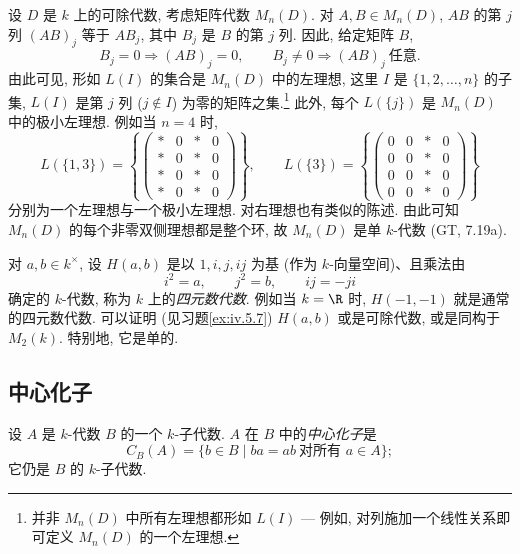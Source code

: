 \begin{example}\label{ex:iv.1.11}
设 $D$ 是 $k$ 上的可除代数, 考虑矩阵代数 $M_n(D)$. 对 $A,B\in M_n(D)$, $AB$ 的第 $j$ 列 $(AB)_j$ 等于 $AB_j$, 其中 $B_j$ 是 $B$ 的第 $j$ 列. 因此, 给定矩阵 $B$,
\[
B_{j}=0\Rightarrow(AB)_{j}=0,\qquad
B_{j}\neq0\Rightarrow(AB)_{j}\ \text{任意}.
\]
由此可见, 形如 $L(I)$ 的集合是 $M_n(D)$ 中的左理想, 这里 $I$ 是 $\{1,2,\ldots,n\}$ 的子集, $L(I)$ 是第 $j$ 列 ($j\notin I$) 为零的矩阵之集.\footnote{并非 $M_n(D)$ 中所有左理想都形如 $L(I)$ — 例如, 对列施加一个线性关系即可定义 $M_n(D)$ 的一个左理想.} 此外, 每个 $L(\{j\})$ 是 $M_n(D)$ 中的极小左理想. 例如当 $n=4$ 时,
\[
L(\{1,3\})=\left\{\begin{pmatrix}*&0&*&0\\ *&0&*&0\\ *&0&*&0\\ *&0&*&0\end{pmatrix}\right\},\qquad
L(\{3\})=\left\{\begin{pmatrix}0&0&*&0\\ 0&0&*&0\\ 0&0&*&0\\ 0&0&*&0\end{pmatrix}\right\}
\]
分别为一个左理想与一个极小左理想. 对右理想也有类似的陈述. 由此可知 $M_n(D)$ 的每个非零双侧理想都是整个环, 故 $M_n(D)$ 是单 $k$-代数 (GT, 7.19a).
\end{example}

\begin{example}\label{ex:iv.1.12}
对 $a,b\in k^{\times}$, 设 $H(a,b)$ 是以 $1,i,j,ij$ 为基 (作为 $k$-向量空间)、且乘法由
\[
i^{2}=a,\qquad j^{2}=b,\qquad ij=-ji
\]
确定的 $k$-代数, 称为 $k$ 上的\emph{四元数代数}. 例如当 $k=\R$ 时, $H(-1,-1)$ 就是通常的四元数代数. 可以证明 (见习题\ref{ex:iv.5.7}) $H(a,b)$ 或是可除代数, 或是同构于 $M_2(k)$. 特别地, 它是单的.
\end{example}

\subsection*{中心化子}

设 $A$ 是 $k$-代数 $B$ 的一个 $k$-子代数. $A$ 在 $B$ 中的\emph{中心化子}是
\[
C_{B}(A)=\{b\in B\mid ba=ab\ \text{对所有 }a\in A\};
\]
它仍是 $B$ 的 $k$-子代数.

